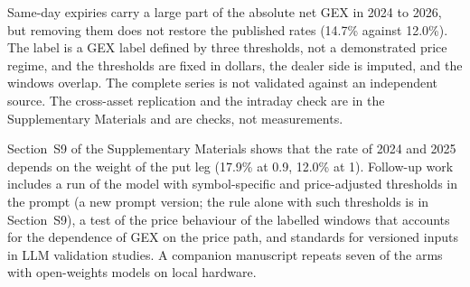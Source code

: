 Same-day expiries carry a large part of the absolute net GEX in 2024 to 2026, but removing them does not restore the published rates (14.7\% against 12.0\%). The label is a GEX label defined by three thresholds, not a demonstrated price regime, and the thresholds are fixed in dollars, the dealer side is imputed, and the windows overlap. The complete series is not validated against an independent source. The cross-asset replication and the intraday check are in the Supplementary Materials and are checks, not measurements.

Section~S9 of the Supplementary Materials shows that the rate of 2024 and 2025 depends on the weight of the put leg (17.9\% at 0.9, 12.0\% at 1). Follow-up work includes a run of the model with symbol-specific and price-adjusted thresholds in the prompt (a new prompt version; the rule alone with such thresholds is in Section~S9), a test of the price behaviour of the labelled windows that accounts for the dependence of GEX on the price path, and standards for versioned inputs in LLM validation studies. A companion manuscript \cite{regan2026openweights} repeats seven of the arms with open-weights models on local hardware.
